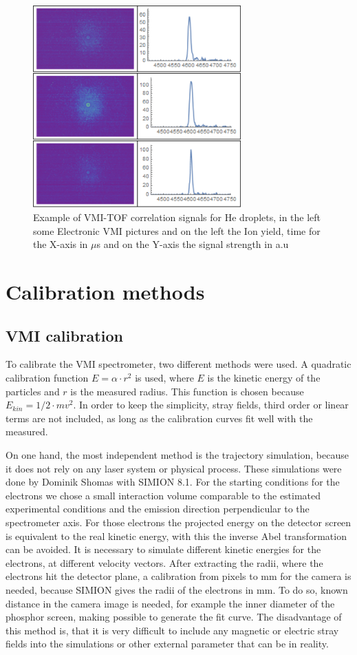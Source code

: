 \begin{figure}[h!]
 \centering
 \includegraphics[width=8cm]{../Images/results/Mir_He_Dropletsize/correlatedsignalexample.png}
  \caption[Correlation signals example]{Example of VMI-TOF correlation signals for He droplets, in the left some Electronic VMI pictures and on the left the Ion yield, time for the X-axis in $\mu$s and  on the Y-axis the signal strength in a.u}
  \label{fig:correlatesimg}
 \end{figure}
  

\section{Calibration methods}

\subsection{VMI calibration}
To calibrate the VMI spectrometer, two different methods were used. A quadratic calibration function $E=\alpha\cdot r^2$ is used, where $E$ is the kinetic energy of the particles and $r$ is the measured radius. This function is chosen because $E_{kin}=1/2 \cdot m v^2$. In order to keep the simplicity, stray fields, third order or linear terms are not included, as long as the calibration curves fit well with the measured.

On one hand, the most independent method is the trajectory simulation, because it does not rely on any laser system or physical process. These simulations were done by Dominik Shomas with SIMION 8.1. For the starting conditions for the electrons we chose a small interaction volume comparable to the estimated experimental conditions and the emission direction perpendicular to the spectrometer axis. For those electrons the projected energy on the detector screen is equivalent to the real kinetic energy, with this the inverse Abel transformation can be avoided. It is necessary to simulate different kinetic energies for the electrons, at different velocity vectors. After extracting the radii, where the electrons hit the detector plane, a calibration from pixels to mm for the camera is needed, because SIMION gives the radii of the electrons in mm. To do so, known distance in the camera image is needed, for example the inner diameter of the phosphor screen, making possible to generate the fit curve. The disadvantage of this method is, that it is very difficult to include any magnetic or electric stray fields into the simulations or other external parameter that can be in reality.

